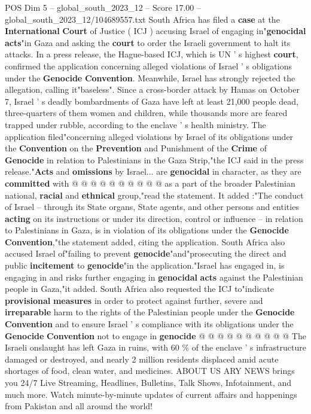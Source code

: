 \begin{textsample}{POS Dim 5 – global\_south\_2023\_12 – Score 17.00 – global\_south\_2023\_12/104689557.txt}  \label{ex:f5_pos_215}
South Africa has filed a \textbf{case} at the \textbf{International} \textbf{Court} of Justice ( ICJ ) accusing Israel of engaging in"\textbf{genocidal} \textbf{acts}"in Gaza and asking the \textbf{court} to order the Israeli government to halt its attacks.
In a press release, the Hague-based ICJ, which is UN ' s highest \textbf{court}, confirmed the application concerning alleged violations of Israel ' s obligations under the \textbf{Genocide} \textbf{Convention}.
Meanwhile, Israel has strongly rejected the allegation, calling it"baseless".
Since a cross-border attack by Hamas on October 7, Israel ' s deadly bombardments of Gaza have left at least 21,000 people dead, three-quarters of them women and children, while thousands more are feared trapped under rubble, according to the enclave ' s health ministry.
The application filed"concerning alleged violations by Israel of its obligations under the \textbf{Convention} on the \textbf{Prevention} and Punishment of the \textbf{Crime} of \textbf{Genocide} in relation to Palestinians in the Gaza Strip,"the ICJ said in the press release."\textbf{Acts} and \textbf{omissions} by Israel... are \textbf{genocidal} in character, as they are \textbf{committed} with @ @ @ @ @ @ @ @ @ @ as a part of the broader Palestinian national, \textbf{racial} and \textbf{ethnical} group,"read the statement.
It added :"The conduct of Israel -- through its State organs, State agents, and other persons and entities \textbf{acting} on its instructions or under its direction, control or influence -- in relation to Palestinians in Gaza, is in violation of its obligations under the \textbf{Genocide} \textbf{Convention},"the statement added, citing the application.
South Africa also accused Israel of"failing to prevent \textbf{genocide}"and"prosecuting the direct and public \textbf{incitement} to \textbf{genocide}"in the application."Israel has engaged in, is engaging in and risks further engaging in \textbf{genocidal} \textbf{acts} against the Palestinian people in Gaza,"it added.
South Africa also requested the ICJ to"indicate \textbf{provisional} \textbf{measures} in order to protect against further, severe and \textbf{irreparable} harm to the rights of the Palestinian people under the \textbf{Genocide} \textbf{Convention} and to ensure Israel ' s compliance with its obligations under the \textbf{Genocide} \textbf{Convention} not to engage in \textbf{genocide} @ @ @ @ @ @ @ @ @ @ The Israeli onslaught has left Gaza in ruins, with 60 \% of the enclave ' s infrastructure damaged or destroyed, and nearly 2 million residents displaced amid acute shortages of food, clean water, and medicines.
ABOUT US ARY NEWS brings you 24/7 Live Streaming, Headlines, Bulletins, Talk Shows, Infotainment, and much more.
Watch minute-by-minute updates of current affairs and happenings from Pakistan and all around the world!

\end{textsample}
